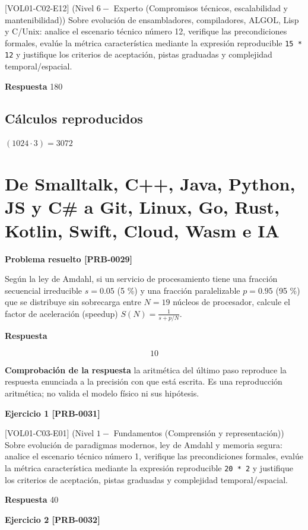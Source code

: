 \documentclass{book}
\begin{document}
[VOL01-C02-E12] (Nivel \(6 -\) Experto (Compromisos técnicos, escalabilidad y mantenibilidad)) Sobre evolución de ensambladores, compiladores, ALGOL, Lisp y C/Unix: analice el escenario técnico número 12, verifique las precondiciones formales, evalúe la métrica característica mediante la expresión reproducible \texttt{15 * 12} y justifique los criterios de aceptación, pistas graduadas y complejidad temporal/espacial.

\noindent\textbf{Respuesta} 180

\subsection*{Cálculos reproducidos}

\(\left(1024\cdot 3\right) = 3072\)

\section{De Smalltalk, C++, Java, Python, JS y C\# a Git, Linux, Go, Rust, Kotlin, Swift, Cloud, Wasm e IA}

\noindent\textbf{Problema resuelto [PRB-0029]}

Según la ley de Amdahl, si un servicio de procesamiento tiene una fracción secuencial irreducible \(s = 0.05\) (5 \%) y una fracción paralelizable \(p = 0.95\) (95 \%) que se distribuye sin sobrecarga entre \(N = 19\) núcleos de procesador, calcule el factor de aceleración (speedup) \(S(N) = \frac{1}{s + p/N}\).

\noindent\textbf{Respuesta}

\[
10
\]

\noindent\textbf{Comprobación de la respuesta} la aritmética del último paso reproduce la respuesta enunciada a la precisión con que está escrita. Es una reproducción aritmética; no valida el modelo físico ni sus hipótesis.

\noindent\textbf{Ejercicio 1 [PRB-0031]}

[VOL01-C03-E01] (Nivel \(1 -\) Fundamentos (Comprensión y representación)) Sobre evolución de paradigmas modernos, ley de Amdahl y memoria segura: analice el escenario técnico número 1, verifique las precondiciones formales, evalúe la métrica característica mediante la expresión reproducible \texttt{20 * 2} y justifique los criterios de aceptación, pistas graduadas y complejidad temporal/espacial.

\noindent\textbf{Respuesta} 40

\noindent\textbf{Ejercicio 2 [PRB-0032]}
\end{document}
